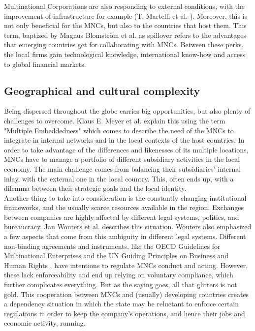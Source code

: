 Multinational Corporations are also responding to external conditions, with the improvement of infrastructure for example (T. Martelli et al. \cite{growthMNCs}). Moreover, this is not only beneficial for the MNCs, but also to the countries that host them. This term, baptized by Magnus Blomström et al. \cite{spilloverMNCs} as spillover refers to the advantages that emerging countries get for collaborating with MNCs. Between these perks, the local firms gain technological knowledge, international know-how and access to global financial markets. 

\subsection{Geographical and cultural complexity}

Being dispersed throughout the globe carries big opportunities, but also plenty of challenges to overcome. Klaus E. Meyer et al. \cite{multipleEmbedeness} explain this using the term "Multiple Embeddedness" which comes to describe the need of the MNCs to integrate in internal networks and in the local contexts of the host countries. In order to take advantage of the differences and likenesses of its multiple locations, MNCs have to manage a portfolio of different subsidiary activities in the local economy. The main challenge comes from balancing their subsidiaries' internal inlay, with the external one in the local country. This, often ends up, with a dilemma between their strategic goals and the local identity.\\

Another thing to take into consideration is the constantly changing institutional frameworks, and the usually scarce resources available in the region. Exchanges between companies are highly affected by different legal systems, politics, and bureaucracy. Jan Wouters et al. \cite{MNCsStrugglesInternationalLaw} describes this situation. Wouters also emphasized a few aspects that come from this ambiguity in different legal systems. Different non-binding agreements and instruments, like the OECD Guidelines for Multinational Enterprises \cite{OECDGuidelines} and the UN Guiding Principles on Business and Human Rights \cite{UNGuidingPrinciples}, have intentions to regulate MNCs conduct and acting. However, these lack enforceability and end up relying on voluntary compliance, which further complicates everything.
But as the saying goes, all that glitters is not gold. This cooperation between MNCs and (usually) developing countries creates a dependency situation in which the state may be reluctant to enforce certain regulations in order to keep the company's operations, and hence their jobs and economic activity, running. 


